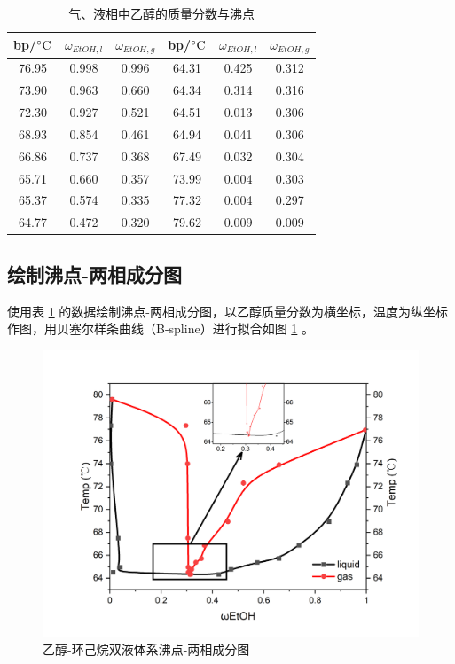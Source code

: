 \documentclass[cn,hazy,pku,12pt,normal,math=newtx,cite=super]{elegantnote}
\begin{document}
\begin{table}[]
    \centering
    \caption{气、液相中乙醇的质量分数与沸点}
    \label{05}
    \begin{tabular}{cccccc}
    \hline
    bp/$\rm \degree C$ & $\omega_{EtOH,l}$ & $\omega_{EtOH,g}$ & bp/$\rm \degree C$ & $\omega_{EtOH,l}$ & $\omega_{EtOH,g}$ \\ \hline
    76.95 & 0.998 & 0.996 & 64.31 & 0.425 & 0.312 \\
    73.90 & 0.963 & 0.660 & 64.34 & 0.314 & 0.316 \\
    72.30 & 0.927 & 0.521 & 64.51 & 0.013 & 0.306 \\
    68.93 & 0.854 & 0.461 & 64.94 & 0.041 & 0.306 \\
    66.86 & 0.737 & 0.368 & 67.49 & 0.032 & 0.304 \\
    65.71 & 0.660 & 0.357 & 73.99 & 0.004 & 0.303 \\
    65.37 & 0.574 & 0.335 & 77.32 & 0.004 & 0.297 \\
    64.77 & 0.472 & 0.320 & 79.62 & 0.009 & 0.009 \\ \hline
    \end{tabular}
\end{table}

\subsection[short]{绘制沸点-两相成分图}

使用表 \ref{05} 的数据绘制沸点-两相成分图，以乙醇质量分数为横坐标，温度为纵坐标作图，用贝塞尔样条曲线（B-spline）进行拟合如图 \ref{7} 。

\begin{figure}[htbp]
    \centering
    \includegraphics[width = .70\textwidth]{image/Graph8.png}
    \caption{乙醇-环己烷双液体系沸点-两相成分图}\label{7}
\end{figure}
\end{document}

